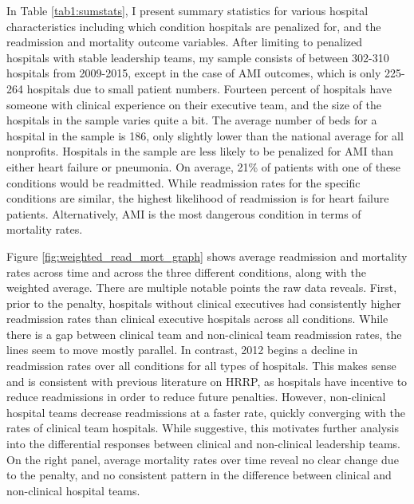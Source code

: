 \documentclass[12pt]{article}
\begin{document}
    In Table \ref{tab1:sumstats}, I present summary statistics for various hospital characteristics including which condition hospitals are penalized for, and the readmission and mortality outcome variables. After limiting to penalized hospitals with stable leadership teams, my sample consists of between 302-310 hospitals from 2009-2015, except in the case of AMI outcomes, which is only 225-264 hospitals due to small patient numbers. Fourteen percent of hospitals have someone with clinical experience on their executive team, and the size of the hospitals in the sample varies quite a bit. The average number of beds for a hospital in the sample is 186, only slightly lower than the national average for all nonprofits. Hospitals in the sample are less likely to be penalized for AMI than either heart failure or pneumonia. On average, 21\% of patients with one of these conditions would be readmitted. While readmission rates for the specific conditions are similar, the highest likelihood of readmission is for heart failure patients. Alternatively, AMI is the most dangerous condition in terms of mortality rates. 

    Figure \ref{fig:weighted_read_mort_graph} shows average readmission and mortality rates across time and across the three different conditions, along with the weighted average. There are multiple notable points the raw data reveals. First, prior to the penalty, hospitals without clinical executives had consistently higher readmission rates than clinical executive hospitals across all conditions. While there is a gap between clinical team and non-clinical team readmission rates, the lines seem to move mostly parallel. In contrast, 2012 begins a decline in readmission rates over all conditions for all types of hospitals. This makes sense and is consistent with previous literature on HRRP, as hospitals have incentive to reduce readmissions in order to reduce future penalties. However, non-clinical hospital teams decrease readmissions at a faster rate, quickly converging with the rates of clinical team hospitals. While suggestive, this motivates further analysis into the differential responses between clinical and non-clinical leadership teams. On the right panel, average mortality rates over time reveal no clear change due to the penalty, and no consistent pattern in the difference between clinical and non-clinical hospital teams. 
\end{document}
